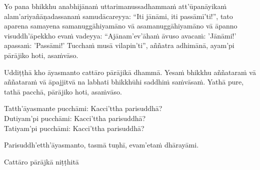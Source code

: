 \label{par4}

Yo pana bhikkhu anabhijānaṁ uttarimanussadhammaṁ att'ūpanāyikaṁ alam'ariyañāṇadassanaṁ samudācareyya: ``Iti jānāmi, iti passāmī'ti!'', tato aparena samayena samanuggāhiyamāno vā asamanuggāhiyamāno vā āpanno visuddh'āpekkho evaṁ vadeyya: ``Ajānam'ev'āhaṁ āvuso avacaṁ: 'Jānāmi!' apassaṁ: 'Passāmi!' Tucchaṁ musā vilapin'ti'', aññatra adhimānā, ayam'pi pārājiko hoti, asaṁvāso.



\medskip

\begin{center}
	Uddiṭṭhā kho āyasmanto cattāro pārājikā dhammā. Yesaṁ bhikkhu aññataraṁ vā aññataraṁ vā āpajjitvā na labhati bhikkhūhi saddhiṁ saṁvāsaṁ. Yathā pure, tathā pacchā, pārājiko hoti, asaṁvāso.

	\smallskip

	Tatth'āyasmante pucchāmi: Kacci'ttha parisuddhā?\\
	Dutiyam'pi pucchāmi: Kacci'ttha parisuddhā?\\
	Tatiyam'pi pucchāmi: Kacci'ttha parisuddhā?

	\smallskip

	Parisuddh'etth'āyasmanto, tasmā tuṇhī, evam'etaṁ dhārayāmi.
\end{center}

\begin{outro}
	Cattāro pārājkā niṭṭhitā\makeatletter\hyperlink{endnote10-appendix}\makeatother
\end{outro}

\clearpage

